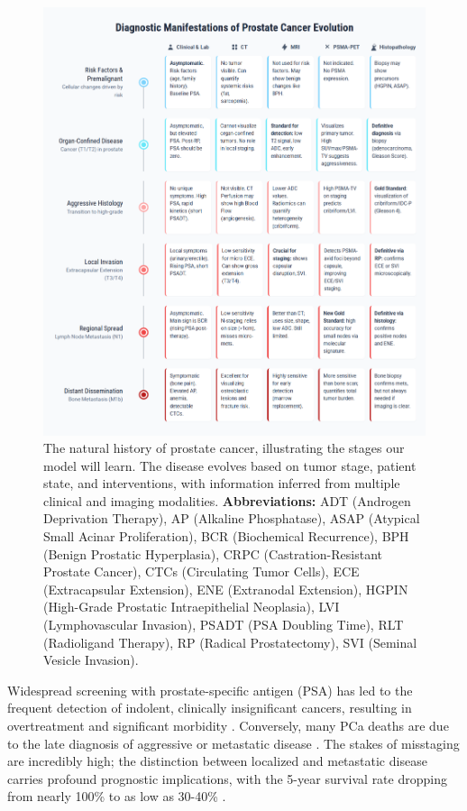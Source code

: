 \documentclass[11pt, a4paper]{article}
\begin{document}
\begin{figure}[H]
    \centering
    \includegraphics[width=\textwidth]{pe.png}
    \caption{The natural history of prostate cancer, illustrating the stages our model will learn. The disease evolves based on tumor stage, patient state, and interventions, with information inferred from multiple clinical and imaging modalities. \textbf{Abbreviations:} ADT (Androgen Deprivation Therapy), AP (Alkaline Phosphatase), ASAP (Atypical Small Acinar Proliferation), BCR (Biochemical Recurrence), BPH (Benign Prostatic Hyperplasia), CRPC (Castration-Resistant Prostate Cancer), CTCs (Circulating Tumor Cells), ECE (Extracapsular Extension), ENE (Extranodal Extension), HGPIN (High-Grade Prostatic Intraepithelial Neoplasia), LVI (Lymphovascular Invasion), PSADT (PSA Doubling Time), RLT (Radioligand Therapy), RP (Radical Prostatectomy), SVI (Seminal Vesicle Invasion).}
    \label{fig:prostate_evolution}
\end{figure}

Widespread screening with prostate-specific antigen (PSA) has led to the frequent detection of indolent, clinically insignificant cancers, resulting in overtreatment and significant morbidity \cite{PadhaniSchoots2023,JenaTaneja2018,CaraccioloCastello2022}. Conversely, many PCa deaths are due to the late diagnosis of aggressive or metastatic disease \cite{PadhaniSchoots2023}. The stakes of misstaging are incredibly high; the distinction between localized and metastatic disease carries profound prognostic implications, with the 5-year survival rate dropping from nearly 100\% to as low as 30-40\% \cite{WangODwyer2024,CereserEvangelista2023}.
\end{document}
